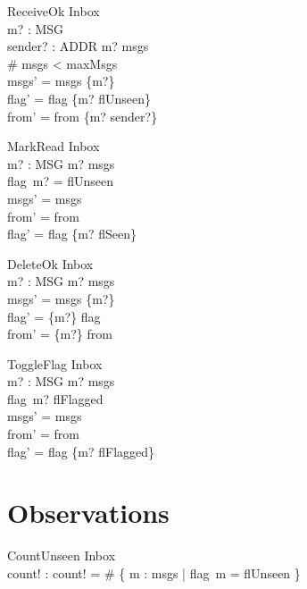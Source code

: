 \documentclass{article}
\begin{document}
\begin{schema}{ReceiveOk}
  \Delta Inbox \\
  m? : MSG \\
  sender? : ADDR
\where
  m? \notin msgs \\
  \# msgs < maxMsgs \\
  msgs' = msgs \cup \{m?\} \\
  flag' = flag \cup \{m? \mapsto flUnseen\} \\
  from' = from \cup \{m? \mapsto sender?\}
\end{schema}

\begin{schema}{MarkRead}
  \Delta Inbox \\
  m? : MSG
\where
  m? \in msgs \\
  flag~m? = flUnseen \\
  msgs' = msgs \\
  from' = from \\
  flag' = flag \oplus \{m? \mapsto flSeen\}
\end{schema}

\begin{schema}{DeleteOk}
  \Delta Inbox \\
  m? : MSG
\where
  m? \in msgs \\
  msgs' = msgs \setminus \{m?\} \\
  flag' = \{m?\} \ndres flag \\
  from' = \{m?\} \ndres from
\end{schema}

\begin{schema}{ToggleFlag}
  \Delta Inbox \\
  m? : MSG
\where
  m? \in msgs \\
  flag~m? \neq flFlagged \\
  msgs' = msgs \\
  from' = from \\
  flag' = flag \oplus \{m? \mapsto flFlagged\}
\end{schema}

\section{Observations}

\begin{schema}{CountUnseen}
  \Xi Inbox \\
  count! : \nat
\where
  count! = \# \{ m : msgs | flag~m = flUnseen \}
\end{schema}
\end{document}
